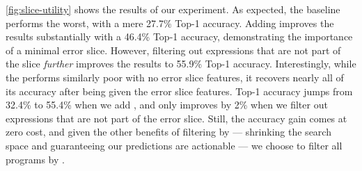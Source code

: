 \autoref{fig:slice-utility} shows the results of our experiment.
%
As expected, the baseline performs the worst, with a mere 27.7\% \linear
Top-1 accuracy.
%
Adding \InSlice improves the results substantially with a 46.4\% \linear Top-1
accuracy, demonstrating the importance of a minimal error slice.
%
However, filtering out expressions that are not part of the slice
\emph{further} improves the results to 55.9\% \linear Top-1 accuracy.
%
Interestingly, while the \hiddenFH performs similarly poor with no error
slice features, it recovers nearly all of its accuracy after being given
the error slice features.
%
Top-1 accuracy jumps from 32.4\% to 55.4\% when we add \InSlice, and only
improves by 2\% when we filter out expressions that are not part of the
error slice.
%
Still, the accuracy gain comes at zero cost, and given the other benefits
of filtering by \InSlice %
--- shrinking the search space and guaranteeing our predictions are actionable ---
we choose to filter all programs by \InSlice.

\label{sec:contextual-features}

